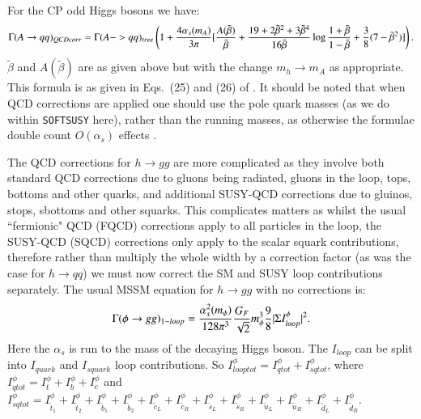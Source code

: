 \documentclass[final,3p,times,pdflatex]{elsarticle}
\begin{document}
For the CP odd Higgs bosons we have:
\begin{equation} \label{AqqQCDcorr}
\begin{aligned}
\Gamma(A \rightarrow qq)_{QCDcorr} = \Gamma(A-> qq)_{tree} \left(1 + {4 \alpha_s(m_A) \over 3 \pi} [{A(\tilde{\beta}) \over \tilde{\beta}} + {19 + 2 \tilde{\beta}^2 + 3 \tilde{\beta}^4 \over 16 \tilde{\beta}} \log{1+\tilde{\beta} \over 1 - \tilde{\beta}} + {3 \over 8} (7 - \tilde{\beta}^2 )]\right).
\end{aligned}
\end{equation}
$\tilde{\beta}$ and $A(\tilde{\beta})$ are as given above but with the change $m_h \rightarrow m_A$ as appropriate.
This formula is as given in Eqs.~(25) and (26) of \cite{Spira:2016}. It should be noted that when QCD corrections are applied one should use the pole quark masses (as we do within {\tt SOFTSUSY} here), rather than the running masses, as otherwise the formulae double count $O(\alpha_s)$ effects \cite{Drees:1990}. 

The QCD corrections for $h \rightarrow gg$ are more complicated as they involve both standard QCD corrections due to gluons being radiated, gluons in the loop, tops, bottoms and other quarks, and additional SUSY-QCD corrections due to gluinos, stops, sbottoms and other squarks. This complicates matters as whilst the usual ``fermionic" QCD (FQCD) corrections  apply to all particles in the loop, the SUSY-QCD (SQCD) corrections only apply to the scalar squark contributions, therefore rather than multiply the whole width by a correction factor (as was the case for $h \rightarrow qq$) we must now correct the SM and SUSY loop contributions separately.
The usual MSSM equation for $h \rightarrow gg$ with no corrections is:
\begin{equation} \label{phiggnorm}
\Gamma(\phi \rightarrow gg)_{1-loop} = {\alpha_{s}^2 (m_\phi) \over 128 \pi^3} {G_{F} \over \sqrt{2}} m_{\phi}^3{9 \over 8}|\Sigma I_{loop}^\phi|^2.
\end{equation}
Here the $\alpha_s$ is run to the mass of the decaying Higgs boson.
The $I_{loop}$ can be split into $I_{quark}$ and $I_{squark}$ loop contributions.
So $I_{looptot}^\phi = I_{qtot}^\phi + I_{sqtot}^\phi$, where $I_{qtot}^\phi = I_t^\phi + I_b^\phi + I_c^\phi$ and $I_{sqtot}^\phi = I_{\tilde{t}_1}^\phi + I_{\tilde{t}_2}^\phi + I_{\tilde{b}_1}^\phi + I_{\tilde{b}_2}^\phi + I_{\tilde{c}_L}^\phi + I_{\tilde{c}_R}^\phi + I_{\tilde{s}_L}^\phi + I_{\tilde{s}_R}^\phi + I_{\tilde{u}_L}^\phi + I_{\tilde{u}_R}^\phi + I_{\tilde{d}_L}^\phi + I_{\tilde{d}_R}^\phi$.
\end{document}
